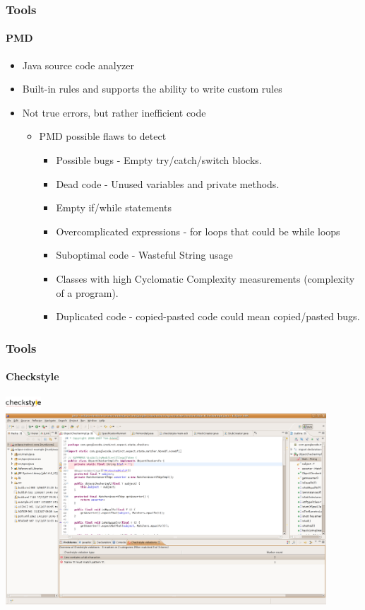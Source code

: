\documentclass{beamer}
\begin{document}
\begin{frame}
\frametitle{Tools}
\framesubtitle{PMD}
\begin{itemize}
\item<1-> Java source code analyzer
\item<2-> Built-in rules and supports the ability to write custom rules
\item<3-> Not true errors, but rather inefficient code
\begin{itemize}
\item<1-> PMD possible flaws to detect
\begin{itemize}
\item<2-> Possible bugs - Empty try/catch/switch blocks.
\item<3-> Dead code - Unused variables and private methods.
\item<4-> Empty if/while statements
\item<5-> Overcomplicated expressions - for loops that could be while loops
\item<6-> Suboptimal code - Wasteful String usage
\item<7-> Classes with high Cyclomatic Complexity measurements (complexity of a program).
\item<8-> Duplicated code - copied-pasted code could mean copied/pasted bugs.
\end{itemize}
\end{itemize}
\end{itemize}
\end{frame}


\begin{frame}
\frametitle{Tools}
\framesubtitle{Checkstyle}
\includegraphics[width=0.1\textwidth]{header-checkstyle-logo}
\includegraphics[width=0.9\textwidth]{Eclipse_Checkstyle_Sample_Error}
\end{frame}
\end{document}
